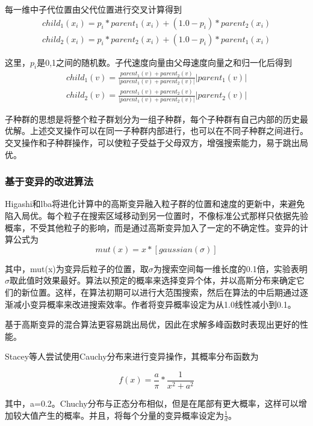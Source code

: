 每一维中子代位置由父代位置进行交叉计算得到
\begin{equation}
\begin{split}
child_1(x_i)=p_i*parent_1(x_i)+(1.0-p_i)*parent_2(x_i)\\
child_2(x_i)=p_i*parent_2(x_i)+(1.0-p_i)*parent_1(x_i)
\end{split}
\end{equation}

这里，$p_i$是0,1之间的随机数。子代速度向量由父母速度向量之和归一化后得到
\begin{equation}
\begin{split}
child_1(v)=\frac{parent_1(v)+parent_2(v)}{|parent_1(v)+parent_2(v)|}|parent_1(v)|\\
child_2(v)=\frac{parent_1(v)+parent_2(v)}{|parent_1(v)+parent_2(v)|}|parent_2(v)|
\end{split}
\end{equation}

子种群的思想是将整个粒子群划分为一组子种群，每个子种群有自己内部的历史最优解。上述交叉操作可以在同一子种群内部进行，也可以在不同子种群之间进行。交叉操作和子种群操作，可以使粒子受益于父母双方，增强搜索能力，易于跳出局优。
\subsubsection{基于变异的改进算法}
Higashi和lba将进化计算中的高斯变异融入粒子群的位置和速度的更新中，来避免陷入局优。每个粒子在搜索区域移动到另一位置时，不像标准公式那样只依据先验概率，不受其他粒子的影响，而是通过高斯变异加入了一定的不确定性。变异的计算公式为
\begin{equation}
mut(x)=x*[gaussian(\sigma)]
\end{equation}

其中，mut(x)为变异后粒子的位置，取$\sigma$为搜索空间每一维长度的0.1倍，实验表明$\sigma$取此值时效果最好。算法以预定的概率来选择变异个体，并以高斯分布来确定它们的新位置。这样，在算法初期可以进行大范围搜索，然后在算法的中后期通过逐渐减小变异概率来改进搜索效率。作者将变异概率设定为从1.0线性减小到0.1。

基于高斯变异的混合算法更容易跳出局优，因此在求解多峰函数时表现出更好的性能。

Stacey等人尝试使用Cauchy分布来进行变异操作，其概率分布函数为

\begin{equation}
f(x)=\frac{a}{\pi}*\frac{1}{x^2+a^2}
\end{equation}

其中，a=0.2。Chuchy分布与正态分布相似，但是在尾部有更大概率，这样可以增加较大值产生的概率。并且，将每个分量的变异概率设定为$\frac{1}{d}$。

